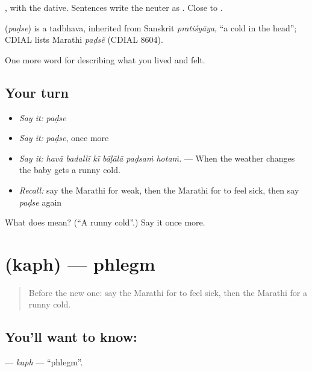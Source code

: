  , with the dative. Sentences write the neuter as . Close to .

\begin{cousinweb}
\textbf{} (\emph{paḍse}) is a tadbhava, inherited from Sanskrit \emph{pratiśyāya}, \textquotedblleft{}a cold in the head\textquotedblright{}; CDIAL lists Marathi \emph{paḍsẽ} (CDIAL 8604).
\end{cousinweb}

\begin{grammarlens}[title={What you've built}]
One more word for describing what you lived and felt.
\end{grammarlens}

\subsection*{Your turn}
\begin{itemize}
\raggedright
  \item \emph{Say it:} \emph{paḍse}
  \item \emph{Say it:} \emph{paḍse}, once more
  \item \emph{Say it:} \emph{havā badallī kī bāḷālā paḍsaṁ hotaṁ.} — When the weather changes the baby gets a runny cold.
  \item \emph{Recall:} say the Marathi for weak, then the Marathi for to feel sick, then say \emph{paḍse} again
\end{itemize}

\begin{tcolorbox}[breakable,colback=teal!4,colframe=teal!35!black,title={Before you move on}]
What does  mean? (\textquotedblleft{}A runny cold\textquotedblright{}.) Say it once more.
\end{tcolorbox}
\section[\texorpdfstring{\mr{कफ} (kaph)}{कफ (kaph)}]{ (kaph) — phlegm}

\label{lesson:MR-C481-kaph}



\begin{quote}
Before the new one: say the Marathi for to feel sick, then the Marathi for a runny cold.
\end{quote}

\subsection*{You'll want to know: }
\textbf{} — \emph{kaph} — \textquotedblleft{}phlegm\textquotedblright{}.

